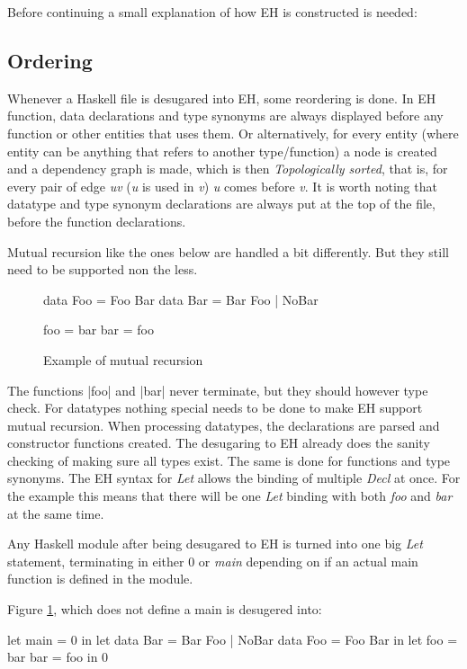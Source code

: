 Before continuing a small explanation of how EH is constructed is needed:
\subsection{Ordering}
Whenever a Haskell file is desugared into EH, some reordering is done. In EH function, data declarations and type synonyms are always displayed before any function or other entities that uses them. Or alternatively, for every entity (where entity can be anything that refers to another type/function) a node is created and a dependency graph is made, which is then \emph{Topologically sorted}, that is, for every pair of edge \emph{uv} (\emph{u} is used in \emph{v}) \emph{u} comes before \emph{v}. It is worth noting that datatype and type synonym declarations are always put at the top of the file, before the function declarations.

Mutual recursion like the ones below are handled a bit differently. But they still need to be supported non the less.

\begin{figure}
\begin{code}
data Foo = Foo Bar
data Bar = Bar Foo | NoBar

foo = bar
bar = foo
\end{code}
\caption{Example of mutual recursion}
\label{fig:mutrecurse}
\end{figure}

The functions |foo| and |bar| never terminate, but they should however type check. For datatypes nothing special needs to be done to make EH support mutual recursion. When processing datatypes, the declarations are parsed and constructor functions created. The desugaring to EH already does the sanity checking of making sure all types exist. The same is done for functions and type synonyms. The EH syntax for \emph{Let} allows the binding of multiple \emph{Decl} at once. For the example this means that there will be one \emph{Let} binding with both \emph{foo} and \emph{bar} at the same time.

Any Haskell module after being desugared to EH is turned into one big \emph{Let} statement, terminating in either 0 or \emph{main} depending on if an actual main function is defined in the module.

Figure \ref{fig:mutrecurse}, which does not define a main is desugered into:

\begin{code}
let main = 0
in let data Bar  = Bar Foo | NoBar
       data Foo  = Foo Bar
   in let foo = bar
          bar = foo
      in 0
\end{code}

